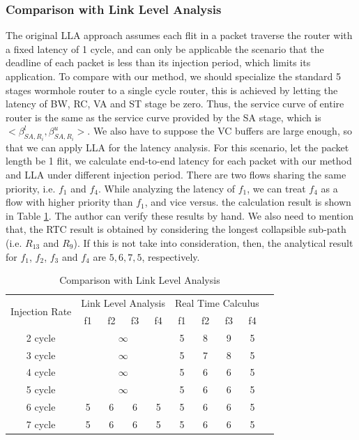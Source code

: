 \documentclass[10pt,journal]{IEEEtran}
\begin{document}
\subsubsection{Comparison with Link Level Analysis}
The original LLA approach assumes each flit in a packet traverse the router with a fixed latency of 1 cycle, and can only be applicable the scenario that the deadline of each packet is less than its injection period, which limits its application. To compare with our method, we should specialize the standard 5 stages wormhole router to a single cycle router, this is achieved by letting the latency of BW, RC, VA and ST stage be zero. Thus, the service curve of entire router is the same as the service curve provided by the SA stage, which is $<\beta_{SA,R_i}^l,\beta_{SA,R_i}^u>$. We also have to suppose the VC buffers are large enough, so that we can apply LLA for the latency analysis. For this scenario, let the packet length be 1 flit, we calculate end-to-end latency for each packet with our method and LLA under different injection period. There are two flows sharing the same priority, i.e. $f_1$ and $f_4$. While analyzing the latency of $f_1$, we can treat $f_4$ as a flow with higher priority than $f_1$, and vice versus. the calculation result is shown in Table \ref{LLAvsRTC}. The author can verify these results by hand. We also need to mention that, the RTC result is obtained by considering the longest collapsible sub-path (i.e. $R_{13}$ and $R_{9}$). If this is not take into consideration, then, the analytical result for $f_1$, $f_2$, $f_3$ and $f_4$ are $5,6,7,5$, respectively.
\begin{table}[htbp]
\centering
\caption{\label{LLAvsRTC}Comparison with Link Level Analysis}
\begin{tabular}{|c|c|c|c|c|c|c|c|c|c|}
\hline
\multirow{2}{*}{Injection Rate}  & \multicolumn{4}{|c|}{Link Level Analysis} & \multicolumn{4}{|c|}{Real Time Calculus} \\
\cline{2-9}
& f1 & f2 & f3 & f4 & f1 & f2 & f3 & f4\\
\hline\hline
2 cycle & \multicolumn{4}{|c|}{$\infty$} & 5 & 8 & 9 & 5\\
\hline
3 cycle & \multicolumn{4}{|c|}{$\infty$} & 5 & 7 & 8 & 5\\
\hline
4 cycle & \multicolumn{4}{|c|}{$\infty$} & 5 & 6 & 6 & 5\\
\hline
5 cycle & \multicolumn{4}{|c|}{$\infty$} & 5 & 6 & 6 & 5\\
\hline
6 cycle & 5 & 6 & 6 & 5 & 5 & 6 & 6 & 5\\
\hline
7 cycle & 5 & 6 & 6 & 5 & 5 & 6 & 6 & 5\\
\hline
\end{tabular}
\end{table}
\end{document}
